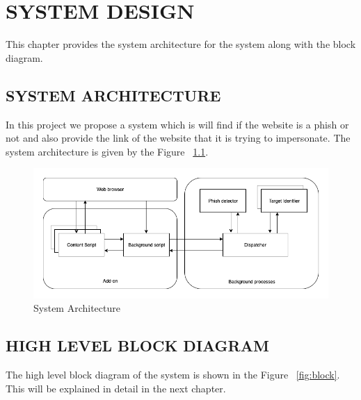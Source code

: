 
\chapter{SYSTEM DESIGN} %

This chapter provides the system architecture for the system along with the block diagram.

\section{SYSTEM ARCHITECTURE}

In this project we propose a system which is will find if the website is a phish or not and also provide the link of the website that it is trying to impersonate. The system architecture is given by the Figure ~\ref{fig:system}.

\begin{figure}[htp]
\centering
\includegraphics[scale=0.5]{Figures/image10.png}
\caption{System Architecture}
\label{fig:system}
\end{figure}

\section{HIGH LEVEL BLOCK DIAGRAM}

The high level block diagram of the system is shown in the Figure ~\ref{fig:block}. This will be explained in detail in the next chapter.

\newpage

